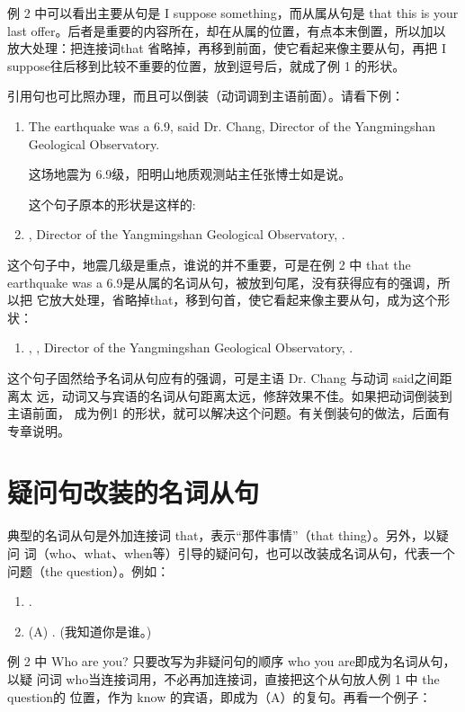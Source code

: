 例 2 中可以看出主要从句是 I suppose something，而从属从句是 that this is
your last offer。后者是重要的内容所在，却在从属的位置，有点本末倒置，所以加以
放大处理：把连接词that 省略掉，再移到前面，使它看起来像主要从句，再把 I
suppose往后移到比较不重要的位置，放到逗号后，就成了例 1 的形状。

引用句也可比照办理，而且可以倒装（动词调到主语前面）。请看下例：
\begin{enumerate}
\item The earthquake was a 6.9, said Dr. Chang, Director of the Yangmingshan
  Geological Observatory.

  这场地震为 6.9级，阳明山地质观测站主任张博士如是说。

  这个句子原本的形状是这样的:

\item {}, Director of the Yangmingshan Geological Observatory,
   .
\end{enumerate}

这个句子中，地震几级是重点，谁说的并不重要，可是在例 2 中 that the
earthquake was a 6.9是从属的名词从句，被放到句尾，没有获得应有的强调，所以把
它放大处理，省略掉that，移到句首，使它看起来像主要从句，成为这个形状：
\begin{enumerate}[resume]
\item {}, , Director of the
  Yangmingshan Geological Observatory, .
\end{enumerate}
这个句子固然给予名词从句应有的强调，可是主语 Dr. Chang 与动词 said之间距离太
远，动词又与宾语的名词从句距离太远，修辞效果不佳。如果把动词倒装到主语前面，
成为例1 的形状，就可以解决这个问题。有关倒装句的做法，后面有专章说明。

\section{疑问句改装的名词从句}

典型的名词从句是外加连接词 that，表示“那件事情”（that thing）。另外，以疑问
词（who、what、when等）引导的疑问句，也可以改装成名词从句，代表一个问题（the
question）。例如：

\begin{enumerate}
\item {}  .
\item {} \reitem (A)   . (我知道你是谁。)
\end{enumerate}
例 2 中 Who are you? 只要改写为非疑问句的顺序 who you are即成为名词从句，以疑
问词 who当连接词用，不必再加连接词，直接把这个从句放人例 1 中 the question的
位置，作为 know 的宾语，即成为（A）的复句。再看一个例子：

